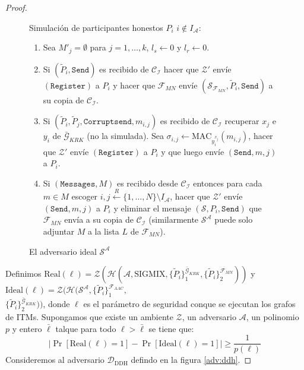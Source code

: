 \begin{proof}
\begin{figure}
{\begin{minipage}[t]{1\columnwidth}
Simulación de participantes honestos $P_i$ $i \notin I_\mathcal{A}$:
\begin{enumerate}
    \item Sea $M'_j = \emptyset$ para $j = 1, \ldots, k$, $l_s \leftarrow 0$ y $l_r \leftarrow 0$.
    \item Si $(\tilde{P}_i, \mathtt{Send})$ es recibido de $\mathcal{C_I}$
          hacer que $\mathcal{Z}'$ envíe $(\mathtt{Register})$ a $P_i$ y hacer que $\mathcal{F}_{MN}$ envíe
          $(\mathcal{S}_{\mathcal{F}_{MN}}, \tilde{P}_i, \mathtt{Send})$ a su copia de $\mathcal{C_I}$.
    \item Si $(\tilde{P}_i, \tilde{P}_j, \mathtt{Corruptsend}, m_{i,j})$ es
          recibido de $\mathcal{C_I}$ recuperar $x_j$ e $y_i$ de
          $\bar{\mathcal{G}}_{KRK}$ (no la simulada). Sea $\sigma_{i,j} \leftarrow
          \mathrm{MAC}_{y_i^{x_j}}(m_{i,j})$,
          hacer que $\mathcal{Z}'$ envíe $(\mathtt{Register})$ a $P_i$ y que luego envíe $(\mathtt{Send}, m, j)$ a
          $P_i$.
    \item Si $(\mathtt{Messages}, M)$ es recibido desde $\mathcal{C_I}$ entonces para cada $m \in M$
          escoger $i,j \overset{R}{\leftarrow} \{1, \ldots, N\} \setminus I_\mathcal{A}$, hacer que $\mathcal{Z}'$
          envíe $(\mathtt{Send}, m, j)$ a $P_i$ y eliminar el mensaje $(\mathcal{S}, P_i, \mathtt{Send})$ que
          $\mathcal{F}_{MN}$ envía a su copia de $\mathcal{C_I}$ (similarmente $\mathcal{S^A}$ puede solo adjuntar
          $M$ a la lista $L$ de $\mathcal{F}_{MN}$).
\end{enumerate}
\end{minipage}}
\caption{El adversario ideal $\mathcal{S^A}$}
\label{adv_S_A}
\end{figure}

Definimos
$\mathrm{Real(\ell)} = \mathcal{Z}(
                    \mathcal{H}(
                        \mathcal{A},
                        \mathrm{SIGMIX},
                        \{\tilde{P}_i\}_1^{\bar{\mathcal{G}}_{KRK}},
                        \{\tilde{P}_i\}_2^{\mathcal{F}_{MN}}))$
y
$\mathrm{Ideal(\ell)} = \mathcal{Z}(
                    \mathcal{H}(
                        \mathcal{S^A},
                        \{\tilde{P}_i\}_1^{\mathcal{F}_{AAC}},$\\$
                        \{\tilde{P}_i\}_2^{\bar{\mathcal{G}}_{KRK}}))$, donde $\ell$ es el parámetro de seguridad
conque se ejecutan los grafos de ITMs.
Supongamos que existe un ambiente $\mathcal{Z}$, un adversario $\mathcal{A}$, un polinomio $p$ y entero
$\bar{\ell}$ talque para todo $\ell >  \bar{\ell}$ se tiene que:
\begin{equation}
\left|
    \Pr[\mathrm{Real(\ell)} = 1]
    - \Pr[\mathrm{Ideal(\ell)} = 1]
\right| \geq \frac{1}{p(\ell)}
\label{eq:guc}
\end{equation}
Consideremos al adversario $\mathcal{D}_\textrm{DDH}$ defindo en la figura \ref{adv:ddh}.


\end{proof}
